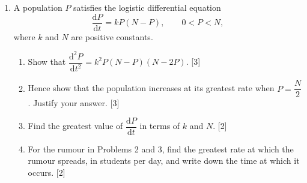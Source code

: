 \documentclass[12pt, twoside]{article}
\begin{document}
\begin{enumerate}[itemsep=0.15cm]
\newpage

\item[4.] [Maximum mark: 10]

A population $P$ satisfies the logistic differential equation
$$\frac{\mathrm{d}P}{\mathrm{d}t} = kP\left(N - P\right), \qquad
0 < P < N,$$
where $k$ and $N$ are positive constants.

\begin{enumerate}[itemsep=0.1cm]
  \item Show that $\dfrac{\mathrm{d}^{2}P}{\mathrm{d}t^{2}} =
  k^{2}P\left(N - P\right)\left(N - 2P\right)$. \hfill [3]
  \item Hence show that the population increases at its greatest rate when
  $P = \dfrac{N}{2}$. Justify your answer. \hfill [3]
  \item Find the greatest value of $\dfrac{\mathrm{d}P}{\mathrm{d}t}$ in
  terms of $k$ and $N$. \hfill [2]
  \item For the rumour in Problems 2 and 3, find the greatest rate at which
  the rumour spreads, in students per day, and write down the time at
  which it occurs. \hfill [2]
\end{enumerate}


\end{enumerate}
\end{document}
